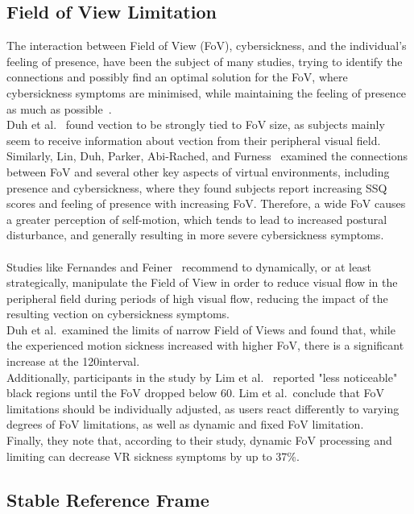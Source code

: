 \subsection{Field of View Limitation}\label{subsec:field-of-view-limitation}

The interaction between Field of View (FoV), cybersickness, and the individual's feeling of presence, have been the
subject of many studies, trying to identify the connections and possibly find an optimal solution for the FoV, where
cybersickness symptoms are minimised, while maintaining the feeling of presence as much as possible~\cite{Weech2019}.
\\
Duh et al.~\cite{Duh2001} found vection to be strongly tied to FoV size, as subjects mainly seem to receive
information about vection from their peripheral visual field.
Similarly, Lin, Duh, Parker, Abi-Rached, and Furness~\cite{Lin2002} examined the connections between FoV and several
other key aspects of virtual environments, including presence and cybersickness, where they found subjects report
increasing SSQ scores and feeling of presence with increasing FoV\@.
Therefore, a wide FoV causes a greater perception of self-motion, which tends to lead to increased postural
disturbance, and generally resulting in more severe cybersickness symptoms.
\\
\\
Studies like Fernandes and Feiner~\cite{Fernandes2016} recommend to dynamically, or at least strategically, manipulate
the Field of View in order to reduce visual flow in the peripheral field during periods of high visual flow, reducing
the impact of the resulting vection on cybersickness symptoms.
\\
Duh et al.\ examined the limits of narrow Field of Views and found that, while the experienced motion sickness
increased with higher FoV, there is a significant increase at the 120\textdegree interval.
\\
Additionally, participants in the study by Lim et al.~\cite{Lim2020} reported "less noticeable" black regions until
the FoV dropped below 60\textdegree.
Lim et al.\ conclude that FoV limitations should be individually adjusted, as users react differently to varying
degrees of FoV limitations, as well as dynamic and fixed FoV limitation.
\\
Finally, they note that, according to their study, dynamic FoV processing and limiting can decrease VR sickness
symptoms by up to 37\%.


\subsection{Stable Reference Frame}\label{subsec:stable-reference-frame}

